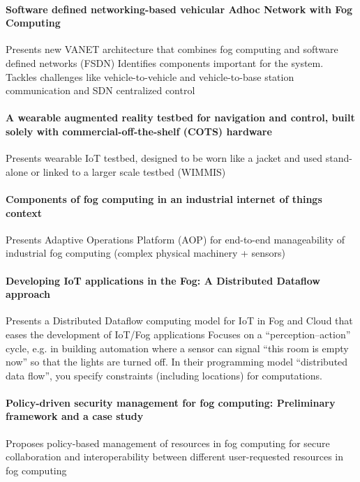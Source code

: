 \paragraph{Software defined networking-based vehicular Adhoc Network with Fog Computing} \cite{truong_software_2015}
Presents new VANET architecture that combines fog computing and software defined networks (FSDN)
Identifies components important for the system. Tackles challenges like vehicle-to-vehicle and vehicle-to-base station communication and SDN centralized control

\paragraph{A wearable augmented reality testbed for navigation and control, built solely with commercial-off-the-shelf (COTS) hardware} \cite{behringer_wearable_2000}
Presents wearable IoT testbed, designed to be worn like a jacket and used stand-alone or linked to a larger scale testbed (WIMMIS)

\paragraph{Components of fog computing in an industrial internet of things context}\cite{gazis_components_2015}
Presents Adaptive Operations Platform (AOP) for end-to-end manageability of industrial fog computing (complex physical machinery + sensors)

\paragraph{Developing IoT applications in the Fog: A Distributed Dataflow approach} \cite{giang_developing_2015}
Presents a Distributed Dataflow computing model for IoT in Fog and Cloud that eases the development of IoT/Fog applications
Focuses on a ``perception--action'' cycle, e.g. in building automation where a sensor can signal ``this room is empty now'' so that the lights are turned off. In their programming model ``distributed data flow'', you specify constraints (including locations) for computations.

\paragraph{Policy-driven security management for fog computing: Preliminary framework and a case study} \cite{dsouza_policy-driven_2014}
Proposes policy-based management of resources in fog computing for secure collaboration and interoperability between different user-requested resources in fog computing
